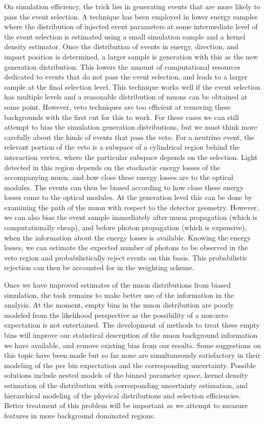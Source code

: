 On simulation efficiency, the trick lies in generating events that are more likely to pass the event selection.
A technique has been employed in lower energy samples where the distribution of injected event parameters at some intermediate level of the event selection is estimated using a small simulation sample and a kernel density estimator.
Once the distribution of events in energy, direction, and impact position is determined, a larger sample is generation with this as the new generation distribution.
This lowers the amount of computational resources dedicated to events that do not pass the event selection, and leads to a larger sample at the final selection level.
This technique works well if the event selection has multiple levels and a reasonable distribution of muons can be obtained at some point.
However, veto techniques are too efficient at removing these backgrounds with the first cut for this to work.
For these cases we can still attempt to bias the simulation generation distributions, but we must think more carefully about the kinds of events that pass the veto.
For a neutrino event, the relevant portion of the veto is a subspace of a cylindrical region behind the interaction vertex, where the particular subspace depends on the selection.
Light detected in this region depends on the stochastic energy losses of the accompanying muon, and how close these energy losses are to the optical modules.
The events can then be biased according to how close these energy losses come to the optical modules.
At the generation level this can be done by examining the path of the muon with respect to the detector geometry.
However, we can also bias the event sample immediately after muon propagation (which is computationally cheap), and before photon propagation (which is expensive), when the information about the energy losses is available.
Knowing the energy losses, we can estimate the expected number of photons to be observed in the veto region and probabilistically reject events on this basis.
This probabilistic rejection can then be accounted for in the weighting scheme.

Once we have improved estimates of the muon distributions from biased simulation, the task remains to make better use of the information in the analysis.
At the moment, empty bins in the muon distribution are poorly modeled from the likelihood perspective as the possibility of a non-zero expectation is not entertained.
The development of methods to treat these empty bins will improve our statistical description of the muon background information we have available, and remove existing bias from our results.
Some suggestions on this topic have been made but so far none are simultaneously satisfactory in their modeling of the per bin expectation and the corresponding uncertainty.
Possible solutions include nested models of the binned parameter space, kernel density estimation of the distribution with corresponding uncertainty estimation, and hierarchical modeling of the physical distributions and selection efficiencies.
Better treatment of this problem will be important as we attempt to measure features in more background dominated regions.

